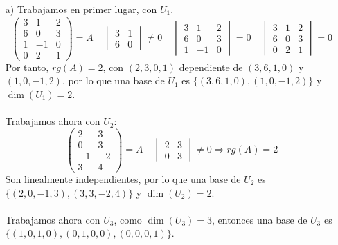 \begin{ejercicio}
\begin{enumerate}
    \item[a)] Trabajamos en primer lugar, con $U_1$.
    \begin{equation*}
        \begin{pmatrix}
            3 & 1 & 2 \\
            6 & 0 & 3 \\
            1 & -1 & 0 \\
            0 & 2 & 1
        \end{pmatrix} = A \quad \begin{vmatrix}
            3 & 1 \\
            6 & 0
        \end{vmatrix} \neq 0 \quad \begin{vmatrix}
            3 & 1 & 2 \\
            6 & 0 & 3 \\
            1 & -1 & 0
        \end{vmatrix} = 0 \quad \begin{vmatrix}
            3 & 1 & 2 \\
            6 & 0 & 3 \\
            0 & 2 & 1
        \end{vmatrix} = 0
    \end{equation*} 
    Por tanto, $rg(A) = 2$, con $(2,3,0,1)$ dependiente de $(3,6,1,0)$ y $(1,0,-1,2)$, por lo que una base de $U_1$ es $\{(3,6,1,0), (1,0,-1,2)\}$ y $\dim(U_1) = 2$.
    \\ \\
    Trabajamos ahora con $U_2$:
    \begin{equation*}
        \begin{pmatrix}
            2 & 3 \\
            0 & 3 \\
            -1 & -2 \\
            3 & 4
        \end{pmatrix} = A \quad \begin{vmatrix}
            2 & 3 \\
            0 & 3
        \end{vmatrix} \neq 0 \Rightarrow rg(A) = 2
    \end{equation*}
    Son linealmente independientes, por lo que una base de $U_2$ es $\{(2,0,-1,3), (3,3,-2,4)\}$ y $\dim(U_2) = 2$.
    \\ \\
    Trabajamos ahora con $U_3$, como $\dim(U_3) = 3$, entonces una base de $U_3$ es $\{(1,0,1,0), (0,1,0,0), (0,0,0,1)\}$.

\end{enumerate}
\end{ejercicio}
